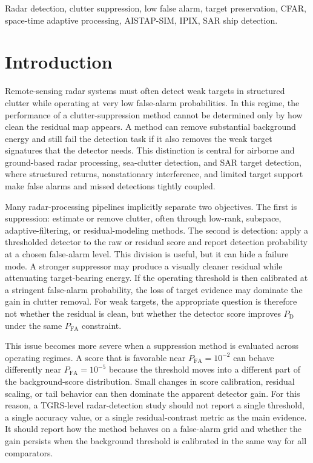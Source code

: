 \documentclass[journal]{IEEEtran}
\begin{document}
\begin{IEEEkeywords}
Radar detection, clutter suppression, low false alarm, target preservation, CFAR, space-time adaptive processing, AISTAP-SIM, IPIX, SAR ship detection.
\end{IEEEkeywords}

\section{Introduction}

Remote-sensing radar systems must often detect weak targets in structured clutter while operating at very low false-alarm probabilities. In this regime, the performance of a clutter-suppression method cannot be determined only by how clean the residual map appears. A method can remove substantial background energy and still fail the detection task if it also removes the weak target signatures that the detector needs. This distinction is central for airborne and ground-based radar processing, sea-clutter detection, and SAR target detection, where structured returns, nonstationary interference, and limited target support make false alarms and missed detections tightly coupled.

Many radar-processing pipelines implicitly separate two objectives. The first is suppression: estimate or remove clutter, often through low-rank, subspace, adaptive-filtering, or residual-modeling methods. The second is detection: apply a thresholded detector to the raw or residual score and report detection probability at a chosen false-alarm level. This division is useful, but it can hide a failure mode. A stronger suppressor may produce a visually cleaner residual while attenuating target-bearing energy. If the operating threshold is then calibrated at a stringent false-alarm probability, the loss of target evidence may dominate the gain in clutter removal. For weak targets, the appropriate question is therefore not whether the residual is clean, but whether the detector score improves $P_{\mathrm{D}}$ under the same $P_{\mathrm{FA}}$ constraint.

This issue becomes more severe when a suppression method is evaluated across operating regimes. A score that is favorable near $P_{\mathrm{FA}}=10^{-2}$ can behave differently near $P_{\mathrm{FA}}=10^{-5}$ because the threshold moves into a different part of the background-score distribution. Small changes in score calibration, residual scaling, or tail behavior can then dominate the apparent detector gain. For this reason, a TGRS-level radar-detection study should not report a single threshold, a single accuracy value, or a single residual-contrast metric as the main evidence. It should report how the method behaves on a false-alarm grid and whether the gain persists when the background threshold is calibrated in the same way for all comparators.
\end{document}
